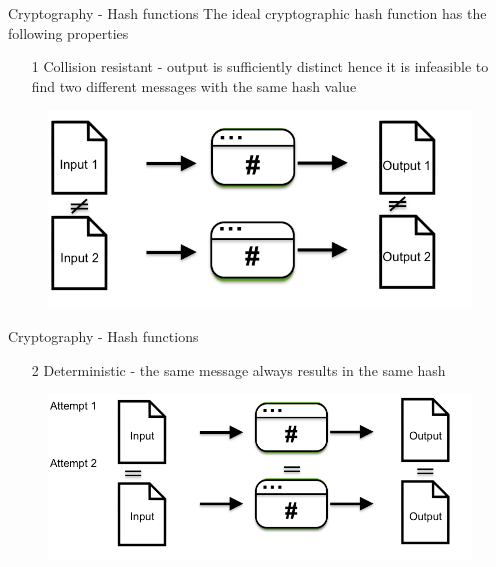 \documentclass[11pt]{beamer}
\begin{document}
\begin{frame}{Cryptography - Hash functions}
	The ideal cryptographic hash function has the following properties
	\begin{enumerate}
		\item[1] Collision resistant - output is sufficiently distinct hence it is infeasible to find two different messages with the same hash value
	\end{enumerate}
	\begin{figure}[]
		\centering
		\includegraphics  [scale=0.3]{Images/hash1}
		\begin{centering}
		\end{centering}
	\end{figure}
\end{frame}


\begin{frame}{Cryptography - Hash functions}
	\begin{enumerate}
		\item[2] Deterministic - the same message always results in the same hash
	\end{enumerate}
	\begin{figure}[]
		\centering
		\includegraphics  [scale=0.3]{Images/hash2}
		\begin{centering}
		\end{centering}
	\end{figure}
\end{frame}
\end{document}
